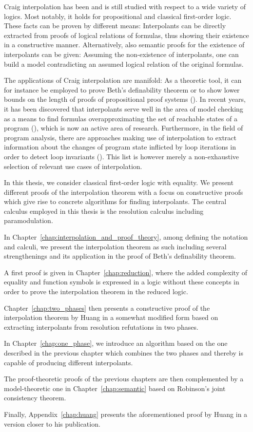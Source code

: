 Craig interpolation has been and is still studied with respect to a wide variety of logics.
Most notably, it holds for propositional and classical first-order logic.
These facts can be proven by different means:
Interpolants can be directly extracted from proofs of logical relations of formulas, thus showing their existence in a constructive manner.
Alternatively, also semantic proofs for the existence of interpolants can be given:
Assuming the non-existence of interpolants, one can build a model contradicting an assumed logical relation of the original formulas.

The applications of Craig interpolation are manifold:
As a theoretic tool, it can for instance be employed to prove Beth's definability theorem or to show lower bounds on the length of proofs of propositional proof systems (\cite{krajivcek1997interpolation,Pudlak97}).
In recent years, it has been discovered that interpolants serve well in the area of model checking as a means to find formulas overapproximating the set of reachable states of a program (\cite{McMillan03}), which is now an active area of research.
Furthermore, in the field of program analysis, there are approaches making use of interpolation to extract information about the changes of program state inflicted by loop iterations in order to detect loop invariants  (\cite{weissenbacher2010}).
This list is however merely a non-exhaustive selection of relevant use cases of interpolation.


In this thesis, we consider classical first-order logic with equality.
We present different proofs of the interpolation theorem with a focus on constructive proofs which give rise to concrete algorithms for finding interpolants.
The central calculus employed in this thesis is the resolution calculus including paramodulation.

In Chapter~\ref{chap:interpolation_and_proof_theory}, among defining the notation and calculi, we present the interpolation theorem as such including several strengthenings and its application in the proof of Beth's definability theorem.

A first proof is given in Chapter~\ref{chap:reduction}, where the added complexity of equality and function symbols is expressed in a logic without these concepts in order to prove the interpolation theorem in the reduced logic.

Chapter~\ref{chap:two_phases} then presents a constructive proof of the interpolation theorem by Huang in a somewhat modified form based on extracting interpolants from resolution refutations in two phases.

In Chapter~\ref{chap:one_phase}, we introduce an algorithm based on the one described in the previous chapter which combines the two phases and thereby is capable of producing different interpolants.

The proof-theoretic proofs of the previous chapters are then complemented by a model-theoretic one in Chapter~\ref{chap:semantic} based on Robinson's joint consistency theorem.

Finally, Appendix~\ref{chap:huang} presents the aforementioned proof by Huang in a version closer to his publication.



